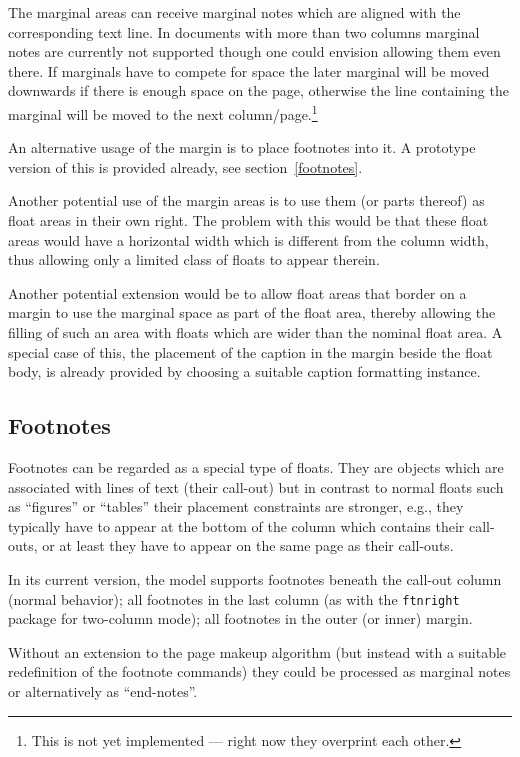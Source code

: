\documentclass[twocolumn]{article}
\begin{document}
The marginal areas can receive marginal notes which are aligned with
the corresponding text line. In documents with more than two columns
marginal notes are currently not supported though one could envision
allowing them even there. If marginals have to compete for space the
later marginal will be moved downwards if there is enough space on the
page, otherwise the line containing the marginal will be moved to the
next column/\allowbreak page.\footnote{This is not yet implemented ---
right now they overprint each other.}

An alternative usage of the margin is to place footnotes into it. A
prototype version of this is provided already, see
section~\vref{footnotes}.

Another potential use of the margin areas is to use them (or parts
thereof) as float areas in their own right. The problem with this
would be that these float areas would have a horizontal width which is
different from the column width, thus allowing only a limited class of
floats to appear therein.

Another potential extension would be to allow float areas that border
on a margin to use the marginal space as part of the float area,
thereby allowing the filling of such an area with floats which are
wider than the nominal float area. A special case of this, the
placement of the caption in the margin beside the float body, is
already provided by choosing a suitable caption formatting instance.




\subsection{Footnotes}\label{footnotes}


Footnotes can be regarded as a special type of floats. They are objects
which are associated with lines of text (their call-out) but in
contrast to normal floats such as ``figures'' or ``tables'' their placement
constraints are stronger, e.g., they typically have to appear at the
bottom of the column which contains their call-outs, or at least they
have to appear on the same page as their call-outs.

In its current version, the model supports footnotes beneath the
call-out column (normal behavior); all footnotes in the last column
(as with the \texttt{ftnright} package for two-column mode); all
footnotes in the outer (or inner) margin. 

Without an extension to the page makeup algorithm (but instead with a
suitable redefinition of the footnote commands) they could be processed
as marginal notes or alternatively as ``end-notes''.
\end{document}
